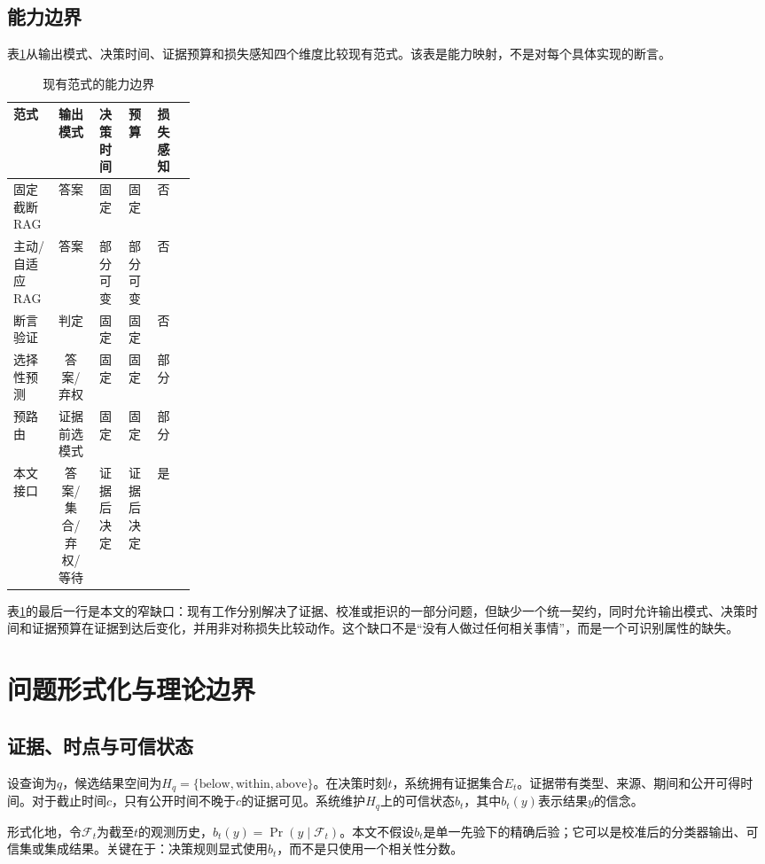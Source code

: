 \documentclass[12pt,openany]{ctexbook}
\begin{document}
\section{能力边界}
表\ref{tab:capability}从输出模式、决策时间、证据预算和损失感知四个维度比较现有范式。该表是能力映射，不是对每个具体实现的断言。\par
\begin{table}[htbp]
\centering
\caption{现有范式的能力边界}
\label{tab:capability}
\begin{tabular}{p{0.24\linewidth}ccccc}
\toprule
范式 & 输出模式 & 决策时间 & 预算 & 损失感知 \\
\midrule
固定截断RAG & 答案 & 固定 & 固定 & 否 \\
主动/自适应RAG & 答案 & 部分可变 & 部分可变 & 否 \\
断言验证 & 判定 & 固定 & 固定 & 否 \\
选择性预测 & 答案/弃权 & 固定 & 固定 & 部分 \\
预路由 & 证据前选模式 & 固定 & 固定 & 部分 \\
本文接口 & 答案/集合/弃权/等待 & 证据后决定 & 证据后决定 & 是 \\
\bottomrule
\end{tabular}
\end{table}
表\ref{tab:capability}的最后一行是本文的窄缺口：现有工作分别解决了证据、校准或拒识的一部分问题，但缺少一个统一契约，同时允许输出模式、决策时间和证据预算在证据到达后变化，并用非对称损失比较动作。这个缺口不是“没有人做过任何相关事情”，而是一个可识别属性的缺失。\par

\chapter{问题形式化与理论边界}
\label{ch:formal}

\section{证据、时点与可信状态}
设查询为$q$，候选结果空间为$H_q=\{\text{below},\text{within},\text{above}\}$。在决策时刻$t$，系统拥有证据集合$E_t$。证据带有类型、来源、期间和公开可得时间。对于截止时间$c$，只有公开时间不晚于$c$的证据可见。系统维护$H_q$上的可信状态$b_t$，其中$b_t(y)$表示结果$y$的信念。\par
形式化地，令$\mathcal{F}_t$为截至$t$的观测历史，$b_t(y)=\Pr(y\mid \mathcal{F}_t)$。本文不假设$b_t$是单一先验下的精确后验；它可以是校准后的分类器输出、可信集或集成结果。关键在于：决策规则显式使用$b_t$，而不是只使用一个相关性分数。\par
\end{document}
